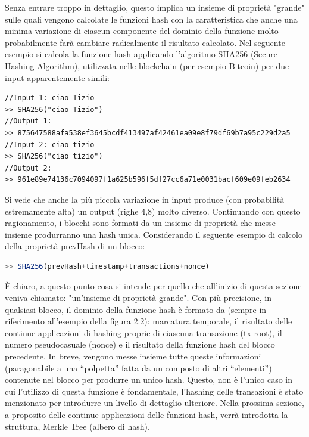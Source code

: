 Senza entrare troppo in dettaglio, questo implica un insieme di proprietà "grande" sulle quali vengono calcolate le funzioni hash con la caratteristica che anche una minima variazione di ciascun componente del dominio della funzione molto probabilmente farà cambiare radicalmente il risultato calcolato.
Nel seguente esempio si calcola la funzione hash applicando l'algoritmo SHA256 (Secure Hashing Algorithm), utilizzata nelle blockchain (per esempio Bitcoin) per due input apparentemente simili: 
\\

\begin{lstlisting}
//Input 1: ciao Tizio
>> SHA256("ciao Tizio")
//Output 1: 
>> 875647588afa538ef3645bcdf413497af42461ea09e8f79df69b7a95c229d2a5
//Input 2: ciao tizio
>> SHA256("ciao tizio")
//Output 2: 
>> 961e89e74136c7094097f1a625b596f5df27cc6a71e0031bacf609e09feb2634
\end{lstlisting}

Si vede che anche la più piccola variazione in input produce (con probabilità estremamente alta) un output (righe 4,8) molto diverso.
Continuando con questo ragionamento, i blocchi sono formati da un insieme di proprietà che messe insieme produrranno una hash unica. Considerando il seguente esempio di calcolo della proprietà prevHash di un blocco:
\\
\begin{lstlisting}[caption={Esempio di calcolo della funzione hash in base alle proprietà del blocco},language=JavaScript]
>> SHA256(prevHash+timestamp+transactions+nonce)
\end{lstlisting}

È chiaro, a questo punto cosa si intende per quello che all'inizio di questa sezione veniva chiamato: "un'insieme di proprietà grande". Con più precisione, in qualsiasi blocco, il dominio della funzione hash è formato da (sempre in riferimento all'esempio della figura 2.2): marcatura temporale, il risultato delle continue applicazioni di hashing proprie di ciascuna transazione (tx root), il numero pseudocasuale (nonce) e il risultato della funzione hash del blocco precedente. In breve, vengono messe insieme tutte queste informazioni (paragonabile a una “polpetta” fatta da un composto di altri “elementi”) contenute nel blocco per produrre un unico hash. Questo, non è l'unico caso in cui l'utilizzo di questa funzione è fondamentale, l'hashing delle transazioni è stato menzionato per introdurre un livello di dettaglio ulteriore. Nella prossima sezione, a proposito delle continue applicazioni delle funzioni hash, verrà introdotta la struttura, Merkle Tree (albero di hash). 

